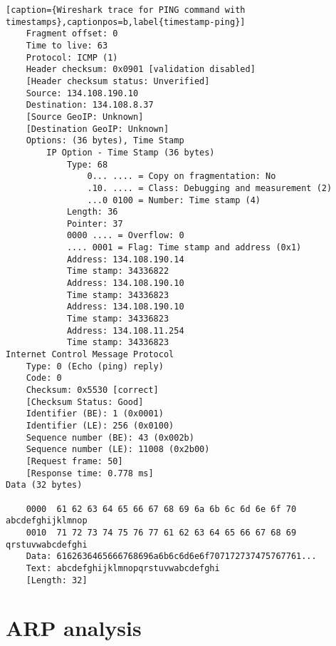 \begin{lstlisting}[caption={Wireshark trace for PING command with timestamps},captionpos=b,label{timestamp-ping}]
	Fragment offset: 0
	Time to live: 63
	Protocol: ICMP (1)
	Header checksum: 0x0901 [validation disabled]
	[Header checksum status: Unverified]
	Source: 134.108.190.10
	Destination: 134.108.8.37
	[Source GeoIP: Unknown]
	[Destination GeoIP: Unknown]
	Options: (36 bytes), Time Stamp
		IP Option - Time Stamp (36 bytes)
			Type: 68
				0... .... = Copy on fragmentation: No
				.10. .... = Class: Debugging and measurement (2)
				...0 0100 = Number: Time stamp (4)
			Length: 36
			Pointer: 37
			0000 .... = Overflow: 0
			.... 0001 = Flag: Time stamp and address (0x1)
			Address: 134.108.190.14
			Time stamp: 34336822
			Address: 134.108.190.10
			Time stamp: 34336823
			Address: 134.108.190.10
			Time stamp: 34336823
			Address: 134.108.11.254
			Time stamp: 34336823
Internet Control Message Protocol
	Type: 0 (Echo (ping) reply)
	Code: 0
	Checksum: 0x5530 [correct]
	[Checksum Status: Good]
	Identifier (BE): 1 (0x0001)
	Identifier (LE): 256 (0x0100)
	Sequence number (BE): 43 (0x002b)
	Sequence number (LE): 11008 (0x2b00)
	[Request frame: 50]
	[Response time: 0.778 ms]
Data (32 bytes)

	0000  61 62 63 64 65 66 67 68 69 6a 6b 6c 6d 6e 6f 70   abcdefghijklmnop
	0010  71 72 73 74 75 76 77 61 62 63 64 65 66 67 68 69   qrstuvwabcdefghi
	Data: 6162636465666768696a6b6c6d6e6f707172737475767761...
	Text: abcdefghijklmnopqrstuvwabcdefghi
	[Length: 32]

\end{lstlisting}

\section{ARP analysis}

